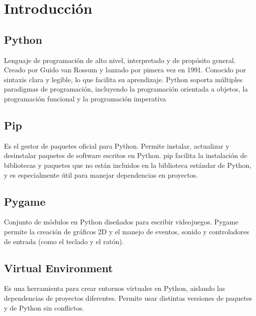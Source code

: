 \documentclass{article}
\begin{document}
  \section{Introducción}
  

  \subsection{Python}
  Lenguaje de programación de alto nivel, interpretado y de propósito general. Creado por Guido van Rossum 
  y lanzado por pimera vez en 1991. Conocido por sintaxis clara y legible, lo que facilita
  su aprendizaje. Python soporta múltiples paradigmas de programación, incluyendo la programación orientada a objetos, 
  la programación funcional y la programación imperativa
  
    
  \subsection{Pip}
  Es el gestor de paquetes oficial para Python. Permite instalar, actualizar y desinstalar paquetes de software escritos 
  en Python. pip facilita la instalación de bibliotecas y paquetes que no están incluidos en la biblioteca estándar de Python, 
  y es especialmente útil para manejar dependencias en proyectos.
  
  
  \subsection{Pygame}
  Conjunto de módulos en Python diseñados para escribir videojuegos. Pygame permite la creación
  de gráficos 2D y el manejo de eventos, sonido y controladores de entrada (como el teclado y el ratón).
  
    
  \subsection{Virtual Environment}
  Es una herramienta para crear entornos virtuales en Python, aislando las dependencias de proyectos diferentes. Permite usar 
  distintas versiones de paquetes y de Python sin conflictos.


  \newpage
  
\end{document}
